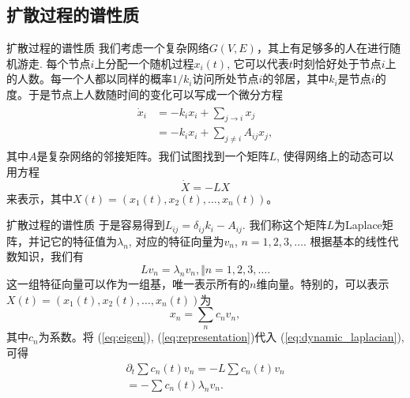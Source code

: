\subsection{扩散过程的谱性质}
\begin{frame}{扩散过程的谱性质}
    我们考虑一个复杂网络$G(V,E)$，其上有足够多的人在进行随机游走. 每个节点$i$上分配一个随机过程$x_i(t)$, 它可以代表$t$时刻恰好处于节点$i$上的人数。每一个人都以同样的概率$1/k_i$访问所处节点$i$的邻居，其中$k_i$是节点$i$的度。于是节点上人数随时间的变化可以写成一个微分方程\begin{align}
    \begin{array}{cc}
         \dot{x}_i &= -k_i x_i + \sum_{j\to i} x_j \\
    &= -k_i x_i +\sum_{j \ne i} A_{ij} x_j,
    \end{array}
\end{align} 其中$A$是复杂网络的邻接矩阵。我们试图找到一个矩阵$L$, 使得网络上的动态可以用方程\begin{equation}
    \dot{X} = - L X
    \label{eq:dynamic_laplacian}
\end{equation}来表示，其中$X(t) = (x_1(t), x_2(t), \dots, x_n(t))$。
\end{frame}

\begin{frame}{扩散过程的谱性质}
    于是容易得到$L_{ij} = \delta_{ij}k_i - A_{ij}$. 我们称这个矩阵$L$为Laplace矩阵，并记它的特征值为$\lambda_n$, 对应的特征向量为$v_n$, $n = 1,2,3,\dots$. 根据基本的线性代数知识，我们有\begin{equation}
    Lv_n = \lambda_n v_n, \Vert n = 1,2,3,\dots.
    \label{eq:eigen}
\end{equation} 这一组特征向量可以作为一组基，唯一表示所有的$n$维向量。特别的，可以表示$X(t) = (x_1(t), x_2(t), \dots, x_n(t))$为\begin{equation}
    x_n = \sum_n c_n v_n, 
    \label{eq:representation}
\end{equation}其中$c_n$为系数。将 (\ref{eq:eigen}), (\ref{eq:representation})代入 (\ref{eq:dynamic_laplacian}), 可得\begin{align}
        \partial_t \sum c_n(t)v_n = -L\sum c_n(t) v_n\\
        = -\sum c_n(t)\lambda_n v_n.
\end{align}
\end{frame}


